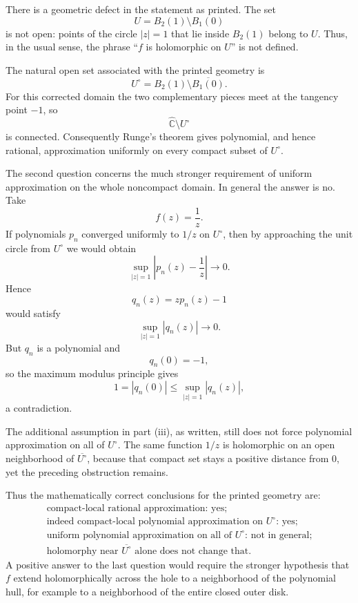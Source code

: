 \begin{solution}
There is a geometric defect in the statement as printed. The set
\[
U=B_2(1)\setminus B_1(0)
\]
is not open: points of the circle \(|z|=1\) that lie inside \(B_2(1)\) belong to \(U\).
Thus, in the usual sense, the phrase ``\(f\) is holomorphic on \(U\)'' is not defined.

The natural open set associated with the printed geometry is
\[
U^\circ=B_2(1)\setminus \overline{B_1(0)}.
\]
For this corrected domain the two complementary pieces meet at the tangency point \(-1\), so
\[
\widehat{\mathbb C}\setminus U^\circ
\]
is connected. Consequently Runge's theorem gives polynomial, and hence rational, approximation
uniformly on every compact subset of \(U^\circ\).

The second question concerns the much stronger requirement of uniform approximation on the
whole noncompact domain. In general the answer is no. Take
\[
f(z)=\frac1z.
\]
If polynomials \(p_n\) converged uniformly to \(1/z\) on \(U^\circ\), then by approaching the
unit circle from \(U^\circ\) we would obtain
\[
\sup_{|z|=1}\left|p_n(z)-\frac1z\right|\longrightarrow0.
\]
Hence
\[
q_n(z)=zp_n(z)-1
\]
would satisfy
\[
\sup_{|z|=1}|q_n(z)|\longrightarrow0.
\]
But \(q_n\) is a polynomial and
\[
q_n(0)=-1,
\]
so the maximum modulus principle gives
\[
1=|q_n(0)|
\le
\sup_{|z|=1}|q_n(z)|,
\]
a contradiction.

The additional assumption in part (iii), as written, still does not force polynomial
approximation on all of \(U^\circ\). The same function \(1/z\) is holomorphic on an open
neighborhood of \(\overline{U^\circ}\), because that compact set stays a positive distance
from \(0\), yet the preceding obstruction remains.

Thus the mathematically correct conclusions for the printed geometry are:
\[
\boxed{
\begin{array}{l}
\text{compact-local rational approximation: yes;}\\
\text{indeed compact-local polynomial approximation on }U^\circ\text{: yes;}\\
\text{uniform polynomial approximation on all of }U^\circ\text{: not in general;}\\
\text{holomorphy near }\overline{U^\circ}\text{ alone does not change that.}
\end{array}}
\]
A positive answer to the last question would require the stronger hypothesis that \(f\)
extend holomorphically across the hole to a neighborhood of the polynomial hull, for example
to a neighborhood of the entire closed outer disk.
\end{solution}


